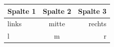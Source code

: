 \begin{tabular}{lcr}
\toprule
Spalte 1 & Spalte 2 & Spalte 3 \\
\midrule
links    & mitte    & rechts   \\
l        & m        & r        \\
\bottomrule
\end{tabular}
